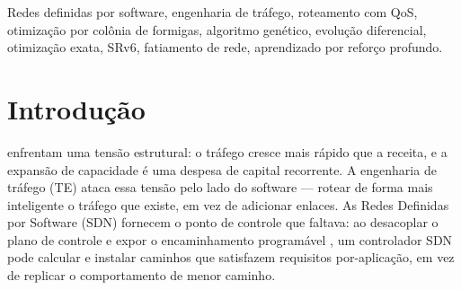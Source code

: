 \documentclass[journal]{IEEEtran}
\begin{document}
\begin{IEEEkeywords}
Redes definidas por software, engenharia de tráfego, roteamento com QoS,
otimização por colônia de formigas, algoritmo genético, evolução
diferencial, otimização exata, SRv6, fatiamento de rede, aprendizado por
reforço profundo.
\end{IEEEkeywords}

\section{Introdução}
 enfrentam uma tensão estrutural: o tráfego cresce
mais rápido que a receita, e a expansão de capacidade é uma despesa de
capital recorrente. A engenharia de tráfego (TE) ataca essa tensão pelo lado
do software --- rotear de forma mais inteligente o tráfego que existe, em vez
de adicionar enlaces. As Redes Definidas por Software (SDN) fornecem o ponto
de controle que faltava: ao desacoplar o plano de controle e expor o
encaminhamento programável \cite{mckeown2008,kim2013,hu2014}, um controlador
SDN pode calcular e instalar caminhos que satisfazem requisitos
por-aplicação, em vez de replicar o comportamento de menor caminho.
\end{document}
